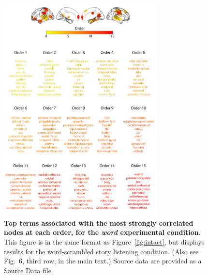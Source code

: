 \documentclass[english]{article}
\newcommand{\neurosynth}{6}
\begin{document}
\begin{figure}[p!]
\centering
\includegraphics[width=0.75\textwidth]{figs/supp_15_word}
\caption{\textbf{Top terms associated with the most strongly
      correlated nodes at each order, for the \textit{word} experimental
    condition.}  This figure is in the same format as
  Figure~\ref{fig:intact}, but displays results for the
  word-scrambled story listening condition.  (Also see Fig.~\neurosynth,
third row, in the main text.) Source data are provided as a Source Data file.}
\label{fig:word}
\end{figure}
\end{document}
